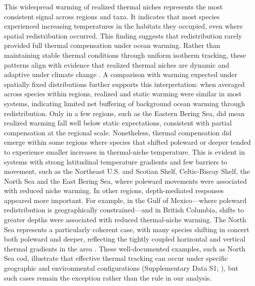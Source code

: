 \documentclass[9pt,twocolumn,twoside]{pnas-new}
\begin{document}
This widespread warming of realized thermal niches represents the most consistent signal across regions and taxa. It indicates that most species experienced increasing temperatures in the habitats they occupied, even where spatial redistribution occurred. This finding suggests that redistribution rarely provided full thermal compensation under ocean warming. Rather than maintaining stable thermal conditions through uniform isotherm tracking, these patterns align with evidence that realized thermal niches are dynamic and adaptive under climate change \citep{fredston_range_2021, ward_win_2024}. A comparison with warming expected under spatially fixed distributions further supports this interpretation: when averaged across species within regions, realized and static warming were similar in most systems, indicating limited net buffering of background ocean warming through redistribution. Only in a few regions, such as the Eastern Bering Sea, did mean realized warming fall well below static expectations, consistent with partial compensation at the regional scale. Nonetheless, thermal compensation did emerge within some regions where species that shifted poleward or deeper tended to experience smaller increases in thermal-niche temperature. This is evident in systems with strong latitudinal temperature gradients and few barriers to movement, such as the Northeast U.S. and Scotian Shelf, Celtic-Biscay Shelf, the North Sea and the East Bering Sea, where poleward movements were associated with reduced niche warming. In other regions, depth-mediated responses appeared more important. For example, in the Gulf of Mexico---where poleward redistribution is geographically constrained---and in British Columbia, shifts to greater depths were associated with reduced thermal-niche warming. The North Sea represents a particularly coherent case, with many species shifting in concert both poleward and deeper, reflecting the tightly coupled horizontal and vertical thermal gradients in the area \citep{ices_atlas_north_sea_1993}. These well-documented examples, such as North Sea cod, illustrate that effective thermal tracking can occur under specific geographic and environmental configurations (Supplementary Data S1; \citealp{perry_climate_2005, engelhard_climate_2014}), but such cases remain the exception rather than the rule in our analysis.
\end{document}

